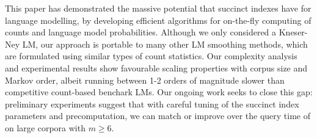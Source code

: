 This paper has demonstrated the massive potential that succinct indexes have for language modelling, by developing efficient algorithms for on-the-fly computing of \ngram counts and language model probabilities.
Although we only considered a Kneser-Ney LM, our approach is portable to many other LM smoothing methods, which are formulated using similar types of count statistics.
Our complexity analysis and experimental results show favourable scaling properties with corpus size and Markov order, albeit running between 1-2 orders of magnitude slower than competitive count-based benchark LMs.
Our ongoing work seeks to close this gap: preliminary experiments suggest that with careful tuning of the succinct index parameters and precomputation, we can match or improve over the query time of \SRILM on large corpora with $m\ge6$.

